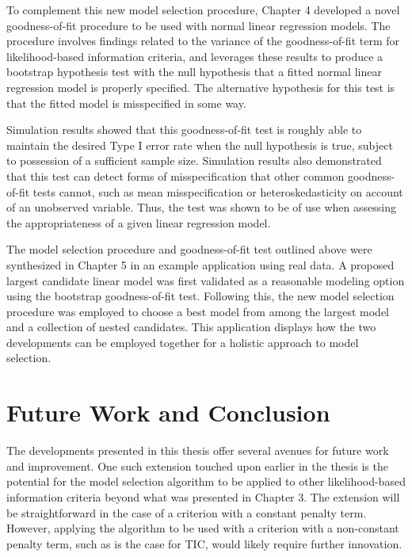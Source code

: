 		To complement this new model selection procedure, Chapter 4 developed a novel goodness-of-fit procedure to be used with normal linear regression models.
		The procedure involves findings related to the variance of the goodness-of-fit term for likelihood-based information criteria, and leverages these
		results to produce a bootstrap hypothesis test with the null hypothesis that a fitted normal linear regression model is properly specified. The alternative
		hypothesis for this test is that the fitted model is misspecified in some way.

		Simulation results showed that this goodness-of-fit test is roughly able to maintain the desired Type I error rate when the null hypothesis is true, subject
		to possession of a sufficient sample size. Simulation results also demonstrated that this test can detect forms of misspecification that other common
		goodness-of-fit tests cannot, such as mean misspecification or heteroskedasticity on account of an unobserved variable. Thus, the test was shown to be of use
		when assessing the appropriateness of a given linear regression model.

		The model selection procedure and goodness-of-fit test outlined above were synthesized in Chapter 5 in an example application using real data. A proposed
		largest candidate linear model was first validated as a reasonable modeling option using the bootstrap goodness-of-fit test. Following this, the new model selection
		procedure was employed to choose a best model from among the largest model and a collection of nested candidates. This application displays how the
		two developments can be employed together for a holistic approach to model selection.

		\section{Future Work and Conclusion}

		The developments presented in this thesis offer several avenues for future work and improvement. One such extension touched upon earlier in the thesis is the
		potential for the model selection algorithm to be applied to other likelihood-based information criteria beyond what was presented in Chapter 3. The extension
		will be straightforward in the case of a criterion with a constant penalty term. However, applying the algorithm to be used with a criterion with a non-constant penalty term,
		such as is the case for TIC, would likely require further innovation.

